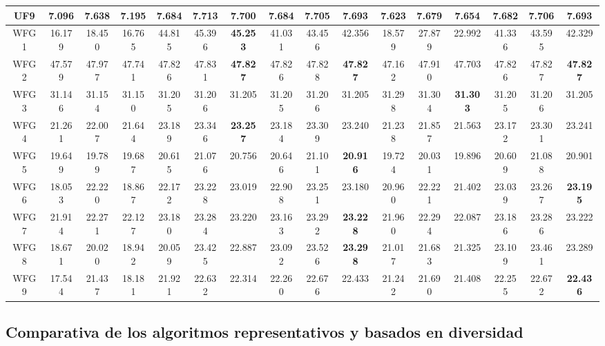 \begin{table}[H]
{\begin{tabular}{c|c|c|c|c|c|c|c|c|c|c|c|c|c|c|c|}
\multicolumn{1}{|c|}{UF9} & 7.096 & 7.638 & 7.195 & 7.684 & 7.713 & \textbf{7.700} & 7.684 & 7.705 & 7.693 & 7.623 & 7.679 & 7.654 & 7.682 & 7.706 & 7.693 \\ \hline
\multicolumn{1}{|c|}{WFG1} & 16.179 & 18.450 & 16.765 & 44.815 & 45.396 & \textbf{45.253} & 41.031 & 43.456 & 42.356 & 18.579 & 27.879 & 22.992 & 41.336 & 43.595 & 42.329 \\ \hline
\multicolumn{1}{|c|}{WFG2} & 47.579 & 47.977 & 47.741 & 47.826 & 47.831 & \textbf{47.827} & 47.826 & 47.828 & \textbf{47.827} & 47.162 & 47.910 & 47.703 & 47.826 & 47.827 & \textbf{47.827} \\ \hline
\multicolumn{1}{|c|}{WFG3} & 31.146 & 31.154 & 31.150 & 31.205 & 31.206 & 31.205 & 31.205 & 31.206 & 31.205 & 31.298 & 31.304 & \textbf{31.303} & 31.205 & 31.206 & 31.205 \\ \hline
\multicolumn{1}{|c|}{WFG4} & 21.261 & 22.007 & 21.644 & 23.189 & 23.346 & \textbf{23.257} & 23.184 & 23.309 & 23.240 & 21.238 & 21.857 & 21.563 & 23.172 & 23.301 & 23.241 \\ \hline
\multicolumn{1}{|c|}{WFG5} & 19.649 & 19.789 & 19.687 & 20.615 & 21.076 & 20.756 & 20.646 & 21.101 & \textbf{20.916} & 19.724 & 20.031 & 19.896 & 20.609 & 21.088 & 20.901 \\ \hline
\multicolumn{1}{|c|}{WFG6} & 18.053 & 22.220 & 18.867 & 22.172 & 23.228 & 23.019 & 22.908 & 23.251 & 23.180 & 20.960 & 22.221 & 21.402 & 23.039 & 23.267 & \textbf{23.195} \\ \hline
\multicolumn{1}{|c|}{WFG7} & 21.914 & 22.271 & 22.127 & 23.180 & 23.284 & 23.220 & 23.163 & 23.292 & \textbf{23.228} & 21.960 & 22.294 & 22.087 & 23.186 & 23.286 & 23.222 \\ \hline
\multicolumn{1}{|c|}{WFG8} & 18.671 & 20.020 & 18.942 & 20.059 & 23.425 & 22.887 & 23.092 & 23.526 & \textbf{23.298} & 21.017 & 21.683 & 21.325 & 23.109 & 23.461 & 23.289 \\ \hline
\multicolumn{1}{|c|}{WFG9} & 17.544 & 21.437 & 18.181 & 21.921 & 22.632 & 22.314 & 22.260 & 22.676 & 22.433 & 21.242 & 21.690 & 21.408 & 22.255 & 22.672 & \textbf{22.436} \\ \hline
\end{tabular}%
}
\end{table}


\subsection{Comparativa de los algoritmos representativos y basados en diversidad}

